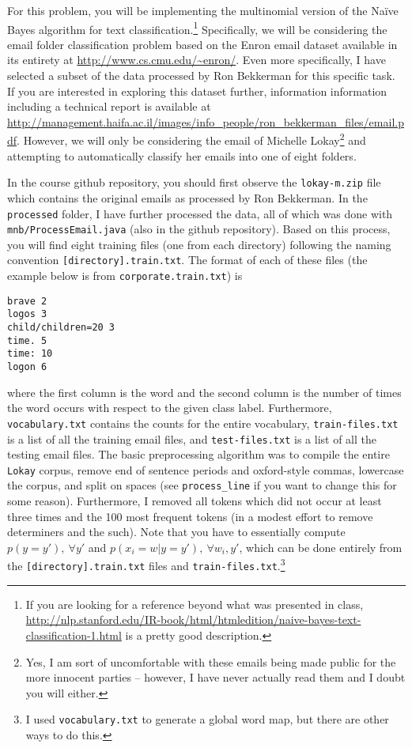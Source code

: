 \documentclass[12pt,letterpaper]{article}
\begin{document}
\begin{enumerate}
For this problem, you will be implementing the multinomial version of the Na\"{i}ve Bayes algorithm for text classification.\footnote{If you are looking for a reference beyond what was presented in class, \url{http://nlp.stanford.edu/IR-book/html/htmledition/naive-bayes-text-classification-1.html} is a pretty good description.}  Specifically, we will be considering the email folder classification problem based on the Enron email dataset available in its entirety at \url{http://www.cs.cmu.edu/~enron/}.  Even more specifically, I have selected a subset of the data processed by Ron Bekkerman for this specific task.  If you are interested in exploring this dataset further, information information including a technical report is available at \url{http://management.haifa.ac.il/images/info_people/ron_bekkerman_files/email.pdf}.  However, we will only be considering the email of Michelle Lokay\footnote{Yes, I am sort of uncomfortable with these emails being made public for the more innocent parties -- however, I have never actually read them and I doubt you will either.} and attempting to automatically classify her emails into one of eight folders.

In the course github repository, you should first observe the {\tt lokay-m.zip} file which contains the original emails as processed by Ron Bekkerman.  In the {\tt processed} folder, I have further processed the data, all of which was done with {\tt mnb/ProcessEmail.java} (also in the github repository).  Based on this process, you will find eight training files (one from each directory) following the naming convention {\tt [directory].train.txt}.  The format of each of these files (the example below is from {\tt corporate.train.txt}) is

\begin{verbatim}
brave 2
logos 3
child/children=20 3
time. 5
time: 10
logon 6
\end{verbatim}

where the first column is the word and the second column is the number of times the word occurs with respect to the given class label.  Furthermore, {\tt vocabulary.txt} contains the counts for the entire vocabulary, {\tt train-files.txt} is a list of all the training email files, and {\tt test-files.txt} is a list of all the testing email files.  The basic preprocessing algorithm was to compile the entire {\tt Lokay} corpus, remove end of sentence periods and oxford-style commas, lowercase the corpus, and split on spaces (see {\tt process\_line} if you want to change this for some reason).  Furthermore, I removed all tokens which did not occur at least three times and the 100 most frequent tokens (in a modest effort to remove determiners and the such).  Note that you have to essentially compute $p(y = y'), \  \forall y'$ and $p(x_i = w | y = y'), \  \forall w_i, y'$, which can be done entirely from the {\tt [directory].train.txt} files and {\tt train-files.txt}.\footnote{I used {\tt vocabulary.txt} to generate a global word map, but there are other ways to do this.}


\end{enumerate}
\end{document}
